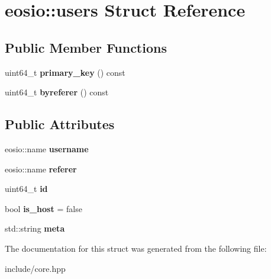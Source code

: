 \hypertarget{structeosio_1_1users}{}\section{eosio\+:\+:users Struct Reference}
\label{structeosio_1_1users}
\subsection*{Public Member Functions}
\begin{DoxyCompactItemize}
\item 
\mbox{\label{structeosio_1_1users_a47aa2a1fb7e34ca0b5bc1a16df09d4be}} 
uint64\+\_\+t {\bfseries primary\+\_\+key} () const
\item 
\mbox{\label{structeosio_1_1users_a32651e54b2b3b4eb456d794a7a5c9857}} 
uint64\+\_\+t {\bfseries byreferer} () const
\end{DoxyCompactItemize}
\subsection*{Public Attributes}
\begin{DoxyCompactItemize}
\item 
\mbox{\label{structeosio_1_1users_a44c509f50d397d7d6c73116a18262a52}} 
eosio\+::name {\bfseries username}
\item 
\mbox{\label{structeosio_1_1users_afab2bcf1c4687bc9a1566c63a2929fde}} 
eosio\+::name {\bfseries referer}
\item 
\mbox{\label{structeosio_1_1users_a5e887dd79303688eecab2f3c30377b28}} 
uint64\+\_\+t {\bfseries id}
\item 
\mbox{\label{structeosio_1_1users_abd1a3bad3b68b2d470f21b4431c58d1e}} 
bool {\bfseries is\+\_\+host} = false
\item 
\mbox{\label{structeosio_1_1users_a75ad43ee45326207c97029d337d3b1fc}} 
std\+::string {\bfseries meta}
\end{DoxyCompactItemize}


The documentation for this struct was generated from the following file\+:\begin{DoxyCompactItemize}
\item 
include/core.\+hpp\end{DoxyCompactItemize}
